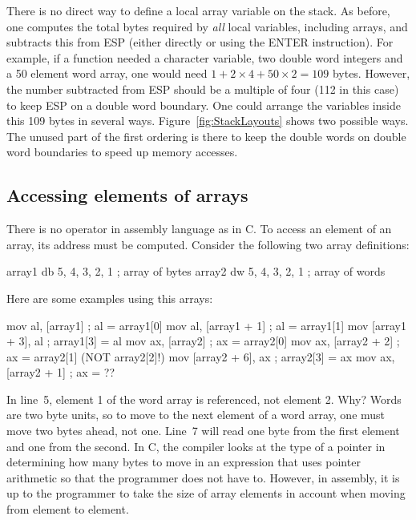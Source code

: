 There is no direct way to define a local array variable on the
stack. As before, one computes the total bytes required by \emph{all}
local variables, including arrays, and subtracts this from ESP (either
directly or using the {\code ENTER} instruction). For example, if a
function needed a character variable, two double word integers and a
50 element word array, one would need $1 + 2 \times 4 + 50 \times 2 =
109$ bytes. However, the number subtracted from ESP should be a
multiple of four (112 in this case) to keep ESP on a double word
boundary. One could arrange the variables inside this 109 bytes in
several ways. Figure~\ref{fig:StackLayouts} shows two possible ways. The
unused part of the first ordering is there to keep the double words on
double word boundaries to speed up memory accesses.

\subsection{Accessing elements of arrays}

There is no {\code [ ]} operator in assembly language as in C. To
access an element of an array, its address must be computed. Consider
the following two array definitions:
\begin{AsmCodeListing}[frame=none, numbers=none]
array1       db     5, 4, 3, 2, 1     ; array of bytes
array2       dw     5, 4, 3, 2, 1     ; array of words
\end{AsmCodeListing}
Here are some examples using this arrays:
\begin{AsmCodeListing}[frame=none]
      mov    al, [array1]             ; al = array1[0]
      mov    al, [array1 + 1]         ; al = array1[1]
      mov    [array1 + 3], al         ; array1[3] = al
      mov    ax, [array2]             ; ax = array2[0]
      mov    ax, [array2 + 2]         ; ax = array2[1] (NOT array2[2]!)
      mov    [array2 + 6], ax         ; array2[3] = ax
      mov    ax, [array2 + 1]         ; ax = ??
\end{AsmCodeListing}
In line~5, element 1 of the word array is referenced, not element 2. Why?
Words are two byte units, so to move to the next element of a word array,
one must move two bytes ahead, not one. Line~7 will read one byte from the
first element and one from the second. In C, the compiler looks at the type
of a pointer in determining how many bytes to move in an expression that
uses pointer arithmetic so that the programmer does not have to. However,
in assembly, it is up to the programmer to take the size of array elements
in account when moving from element to element.

